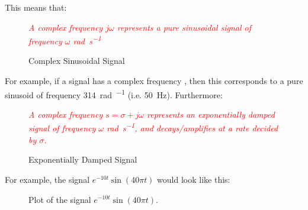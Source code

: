 \documentclass[../notes-main.tex]{subfiles}
\begin{document}
\noindent This means that:
\begin{figure}[H]
    \centering
    \begin{mdframed}
        \begin{center}
            \textcolor{red}{\emph{A complex frequency \(j\omega \) represents a pure sinusoidal signal of frequency \(\omega \) \unit{\radian\per\second}}}
        \end{center}
    \end{mdframed}\label{fig:complex-sinusoid-def-1}
    \vspace{-1em}\caption{Complex Sinusoidal Signal}
\end{figure}
\vspace{-1em}
\noindent For example, if a signal has a complex frequency  , then this corresponds to a pure sinusoid of frequency \SI{314}{\radian\per\sec} (i.e. \SI{50}{\hertz}). Furthermore:
\begin{figure}[H]
    \centering
    \begin{mdframed}
        \begin{center}
            \textcolor{red}{%
                \emph{A complex frequency \(s = \sigma + j\omega \) represents an exponentially
                    damped signal of frequency \(\omega \) \unit{\radian\per\second}, and decays/amplifies at a rate decided by \(\sigma \).}}
        \end{center}
    \end{mdframed}\label{fig:exp-damped-sinusoid-def-1}
    \vspace{-1em}\caption{Exponentially Damped Signal}
\end{figure}
\vspace{-1em}
\noindent For example, the signal \( e^{- 10t}\sin(40\pi t) \) would look like this:
\begin{figure}[H]
    \centering
    \vspace{-1em}\caption{Plot of the signal \(e^{-10t}\sin(40\pi t)\).}\label{fig:exp-damped-sinusoid-plot-1}
\end{figure}
\vspace{-1em}
\newpage
\end{document}
